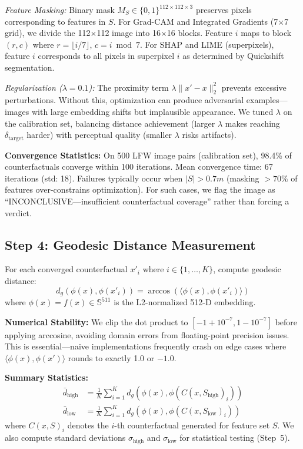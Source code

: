 \textit{Feature Masking:} Binary mask $M_S \in \{0, 1\}^{112 \times 112 \times 3}$ preserves pixels corresponding to features in $S$. For Grad-CAM and Integrated Gradients (7$\times$7 grid), we divide the 112$\times$112 image into 16$\times$16 blocks. Feature $i$ maps to block $(r,c)$ where $r = \lfloor i/7 \rfloor$, $c = i \bmod 7$. For SHAP and LIME (superpixels), feature $i$ corresponds to all pixels in superpixel $i$ as determined by Quickshift segmentation.

\textit{Regularization ($\lambda = 0.1$):} The proximity term $\lambda \|x' - x\|_2^2$ prevents excessive perturbations. Without this, optimization can produce adversarial examples—images with large embedding shifts but implausible appearance. We tuned $\lambda$ on the calibration set, balancing distance achievement (larger $\lambda$ makes reaching $\delta_{\text{target}}$ harder) with perceptual quality (smaller $\lambda$ risks artifacts).

\textbf{Convergence Statistics:} On 500 LFW image pairs (calibration set), 98.4\% of counterfactuals converge within 100 iterations. Mean convergence time: 67 iterations (std: 18). Failures typically occur when $|S| > 0.7m$ (masking $>70\%$ of features over-constrains optimization). For such cases, we flag the image as ``INCONCLUSIVE—insufficient counterfactual coverage'' rather than forcing a verdict.

\subsection{Step 4: Geodesic Distance Measurement}

For each converged counterfactual $x'_i$ where $i \in \{1, \ldots, K\}$, compute geodesic distance:
\begin{equation}
d_g(\phi(x), \phi(x'_i)) = \arccos\left(\langle \phi(x), \phi(x'_i) \rangle\right)
\end{equation}
where $\phi(x) = f(x) \in \mathbb{S}^{511}$ is the L2-normalized 512-D embedding.

\textbf{Numerical Stability:} We clip the dot product to $[-1+10^{-7}, 1-10^{-7}]$ before applying arccosine, avoiding domain errors from floating-point precision issues. This is essential—naive implementations frequently crash on edge cases where $\langle \phi(x), \phi(x') \rangle$ rounds to exactly 1.0 or $-1.0$.

\textbf{Summary Statistics:}
\begin{align}
\bar{d}_{\text{high}} &= \frac{1}{K} \sum_{i=1}^K d_g(\phi(x), \phi(C(x, S_{\text{high}})_i)) \\
\bar{d}_{\text{low}} &= \frac{1}{K} \sum_{i=1}^K d_g(\phi(x), \phi(C(x, S_{\text{low}})_i))
\end{align}
where $C(x, S)_i$ denotes the $i$-th counterfactual generated for feature set $S$. We also compute standard deviations $\sigma_{\text{high}}$ and $\sigma_{\text{low}}$ for statistical testing (Step~5).

